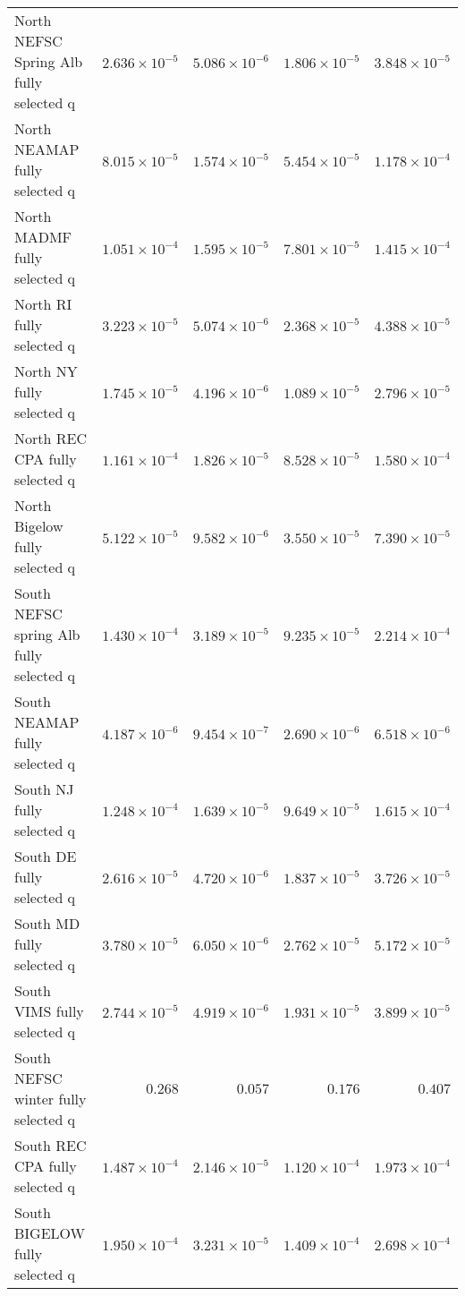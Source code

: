 \documentclass[
]{article}
\begin{document}
\begin{landscape}
\begin{longtable}[t]{lrrrr}
\addlinespace
North NEFSC Spring Alb fully selected q & $2.636\times 10^{-5}$ & $5.086\times 10^{-6}$ & $1.806\times 10^{-5}$ & $3.848\times 10^{-5}$\\
North NEAMAP fully selected q & $8.015\times 10^{-5}$ & $1.574\times 10^{-5}$ & $5.454\times 10^{-5}$ & $1.178\times 10^{-4}$\\
North MADMF fully selected q & $1.051\times 10^{-4}$ & $1.595\times 10^{-5}$ & $7.801\times 10^{-5}$ & $1.415\times 10^{-4}$\\
North RI fully selected q & $3.223\times 10^{-5}$ & $5.074\times 10^{-6}$ & $2.368\times 10^{-5}$ & $4.388\times 10^{-5}$\\
North NY fully selected q & $1.745\times 10^{-5}$ & $4.196\times 10^{-6}$ & $1.089\times 10^{-5}$ & $2.796\times 10^{-5}$\\
\addlinespace
North REC CPA fully selected q & $1.161\times 10^{-4}$ & $1.826\times 10^{-5}$ & $8.528\times 10^{-5}$ & $1.580\times 10^{-4}$\\
North Bigelow fully selected q & $5.122\times 10^{-5}$ & $9.582\times 10^{-6}$ & $3.550\times 10^{-5}$ & $7.390\times 10^{-5}$\\
South NEFSC spring Alb fully selected q & $1.430\times 10^{-4}$ & $3.189\times 10^{-5}$ & $9.235\times 10^{-5}$ & $2.214\times 10^{-4}$\\
South NEAMAP fully selected q & $4.187\times 10^{-6}$ & $9.454\times 10^{-7}$ & $2.690\times 10^{-6}$ & $6.518\times 10^{-6}$\\
South NJ fully selected q & $1.248\times 10^{-4}$ & $1.639\times 10^{-5}$ & $9.649\times 10^{-5}$ & $1.615\times 10^{-4}$\\
\addlinespace
South DE fully selected q & $2.616\times 10^{-5}$ & $4.720\times 10^{-6}$ & $1.837\times 10^{-5}$ & $3.726\times 10^{-5}$\\
South MD fully selected q & $3.780\times 10^{-5}$ & $6.050\times 10^{-6}$ & $2.762\times 10^{-5}$ & $5.172\times 10^{-5}$\\
South VIMS fully selected q & $2.744\times 10^{-5}$ & $4.919\times 10^{-6}$ & $1.931\times 10^{-5}$ & $3.899\times 10^{-5}$\\
South NEFSC winter fully selected q & $0.268$ & $0.057$ & $0.176$ & $0.407$\\
South REC CPA fully selected q & $1.487\times 10^{-4}$ & $2.146\times 10^{-5}$ & $1.120\times 10^{-4}$ & $1.973\times 10^{-4}$\\
\addlinespace
South BIGELOW fully selected q & $1.950\times 10^{-4}$ & $3.231\times 10^{-5}$ & $1.409\times 10^{-4}$ & $2.698\times 10^{-4}$\\

\end{longtable}
\end{landscape}
\end{document}
